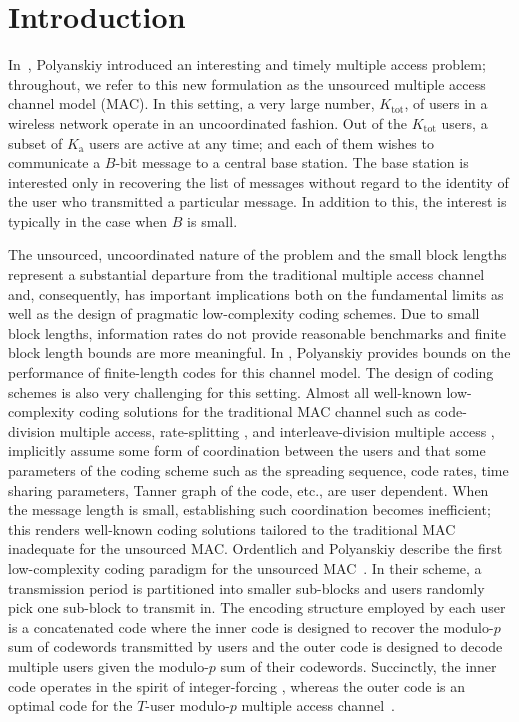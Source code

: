 \documentclass[final,onecolumn,12pt]{IEEEtran}
\def\Ktot{K_{\text{tot}}}
\def\Ka{K_{\text{a}}}
\begin{document}
\section{Introduction}
In~\cite{polyanskiy17}, Polyanskiy introduced an interesting and timely multiple access problem; throughout, we refer to this new formulation as the unsourced multiple access channel model (MAC). In this setting, a very large number, $\Ktot$, of users in a wireless network operate in an uncoordinated fashion. Out of the $\Ktot$ users, a subset of $\Ka$ users are active at any time; and each of them wishes to communicate a $B$-bit message to a central base station. The base station is interested only in recovering the list of messages without regard to the identity of the user who transmitted a particular message. In addition to this, the interest is typically in the case when $B$ is small.

The unsourced, uncoordinated nature of the problem and the small block lengths represent a substantial departure from the traditional multiple access channel and, consequently, has important implications both on the fundamental limits as well as the design of pragmatic low-complexity coding schemes. Due to small block lengths, information rates do not provide reasonable benchmarks and finite block length bounds are more meaningful. In \cite{polyanskiy17}, Polyanskiy provides bounds on the performance of finite-length codes for this channel model.
%
The design of coding schemes is also very challenging for this setting. Almost all well-known low-complexity coding solutions for the traditional MAC channel such as code-division multiple access, rate-splitting \cite{rimoldi1996rate}, and interleave-division multiple access \cite{ping2006interleave}, implicitly assume some form of coordination between the users and that some parameters of the coding scheme such as the spreading sequence, code rates, time sharing parameters, Tanner graph of the code, etc., are user dependent. When the message length is small, establishing such coordination becomes inefficient; this renders well-known coding solutions tailored to the traditional MAC inadequate for the unsourced MAC. Ordentlich and Polyanskiy describe the first low-complexity coding paradigm for the unsourced MAC~\cite{ordentlich17}. In their scheme, a transmission period is partitioned into smaller sub-blocks and users randomly pick one sub-block to transmit in. The encoding structure employed by each user is a concatenated code where the inner code is designed to recover the modulo-$p$ sum of codewords transmitted by users and the outer code is designed to decode multiple users given the modulo-$p$ sum of their codewords. Succinctly, the inner code operates in the spirit of integer-forcing \cite{zhan2014integer}, whereas the outer code is an optimal code for the $T$-user modulo-$p$ multiple access channel~\cite{mathys1990class}.
\end{document}
